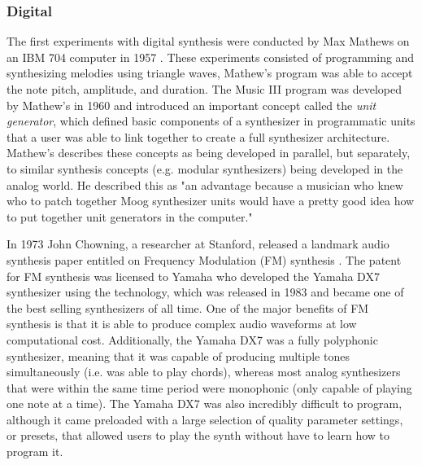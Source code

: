 \subsubsection{Digital}
The first experiments with digital synthesis were conducted by Max Mathews on an IBM 704 computer in 1957 \cite{roads1980interview}. These experiments consisted of programming and synthesizing melodies using triangle waves, Mathew's program was able to accept the note pitch, amplitude, and duration. The Music III program was developed by Mathew's in 1960 and introduced an important concept called the \textit{unit generator}, which defined basic components of a synthesizer in programmatic units that a user was able to link together to create a full synthesizer architecture. Mathew's describes these concepts as being developed in parallel, but separately, to similar synthesis concepts (e.g. modular synthesizers) being developed in the analog world. He described this as "an advantage because a musician who knew who to patch together Moog synthesizer units would have a pretty good idea how to put together unit generators in the computer."

In 1973 John Chowning, a researcher at Stanford, released a landmark audio synthesis paper entitled on Frequency Modulation (FM) synthesis \cite{chowning1973synthesis}. The patent for FM synthesis was licensed to Yamaha who developed the Yamaha DX7 synthesizer using the technology, which was released in 1983 and became one of the best selling synthesizers of all time. One of the major benefits of FM synthesis is that it is able to produce complex audio waveforms at low computational cost. Additionally, the Yamaha DX7 was a fully polyphonic synthesizer, meaning that it was capable of producing multiple tones simultaneously (i.e. was able to play chords), whereas most analog synthesizers that were within the same time period were monophonic (only capable of playing one note at a time). The Yamaha DX7 was also incredibly difficult to program, although it came preloaded with a large selection of quality parameter settings, or presets, that allowed users to play the synth without have to learn how to program it.

